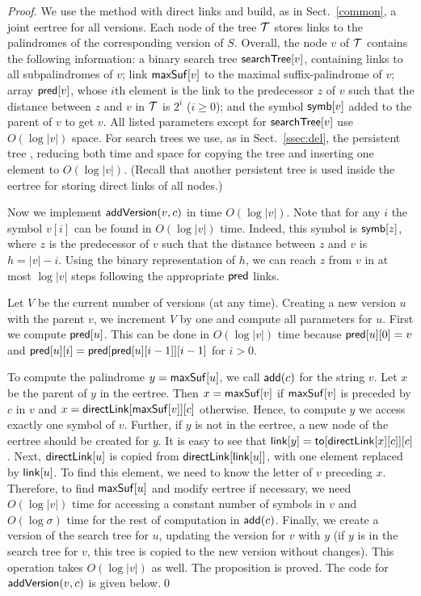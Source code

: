\documentclass{llncs}
\def\add{{\sf add}}
\def\maxsuf{{\sf maxSuf}}
\def\link{{\sf link}}
\def\go{{\sf to}}
\def\direct{{\sf directLink}}
\def\addv{{\sf addVersion}}
\def\search{{\sf searchTree}}
\def\pred{{\sf pred}}
\def\symb{{\sf symb}}
\def\cT{{\cal T}}
\begin{document}
\begin{proof}
We use the method with direct links and build, as in Sect.~\ref{common}, a joint eertree for all versions. Each node of the tree $\cT$ stores links to the palindromes of the corresponding version of $S$. Overall, the node $v$ of $\cT$ contains the following information: a binary search tree $\search[v]$, containing links to all subpalindromes of $v$; link $\maxsuf[v]$ to the maximal suffix-palindrome of $v$; array $\pred[v]$, whose $i$th element is the link to the predecessor $z$ of $v$ such that the distance between $z$ and $v$ in $\cT$ is $2^i$ ($i\ge 0$); and the symbol $\symb[v]$ added to the parent of $v$ to get $v$. All listed parameters except for $\search[v]$ use $O(\log|v|)$ space. For search trees we use, as in Sect.~\ref{ssec:del}, the persistent tree \cite{DSST89}, reducing both time and space for copying the tree and inserting one element to  $O(\log|v|)$. (Recall that another persistent tree is used inside the eertree for storing direct links of all nodes.)

Now we implement $\addv(v,c)$ in time $O(\log|v|)$. Note that for any $i$ the symbol $v[i]$ can be found in $O(\log|v|)$ time. Indeed, this symbol is $\symb[z]$, where $z$ is the predecessor of $v$ such that the distance between $z$ and $v$ is $h = |v|-i$. Using the binary representation of $h$, we can reach $z$ from $v$ in at most $\log |v|$ steps following the appropriate $\pred$ links. 

Let $V$ be the current number of versions (at any time). Creating a new version $u$ with the parent $v$, we increment $V$ by one and compute all parameters for $u$. First we compute $\pred[u]$. This can be done in $O(\log|v|)$ time because $\pred[u][0]=v$ and $\pred[u][i]=\pred[\pred[u][i-1]][i-1]$ for $i>0$.

To compute the palindrome $y=\maxsuf[u]$, we call $\add(c)$ for the string $v$. Let $x$ be the parent of $y$ in the eertree. Then $x=\maxsuf[v]$ if $\maxsuf[v]$ is preceded by $c$ in $v$ and $x=\direct[\maxsuf[v]][c]$ otherwise. Hence, to compute $y$ we access exactly one symbol of $v$. Further, if $y$ is not in the eertree, a new node of the eertree should be created for $y$. It is easy to see that $\link[y]=\go[\direct[x][c]][c]$. Next, $\direct[u]$ is copied from $\direct[\link[u]]$, with one element replaced by $\link[u]$. To find this element, we need to know the letter of $v$ preceding $x$. Therefore, to find $\maxsuf[u]$ and modify eertree if necessary, we need $O(\log|v|)$ time for accessing a constant number of symbols in $v$ and $O(\log\sigma)$ time for the rest of computation in $\add(c)$. Finally, we create a version of the search tree for $u$, updating the version for $v$ with $y$ (if $y$ is in the search tree for $v$, this tree is copied to the new version without changes). This operation takes $O(\log|v|)$ as well. The proposition is proved. The code for $\addv(v,c)$ is given below.\qed
\end{proof}
\end{document}
